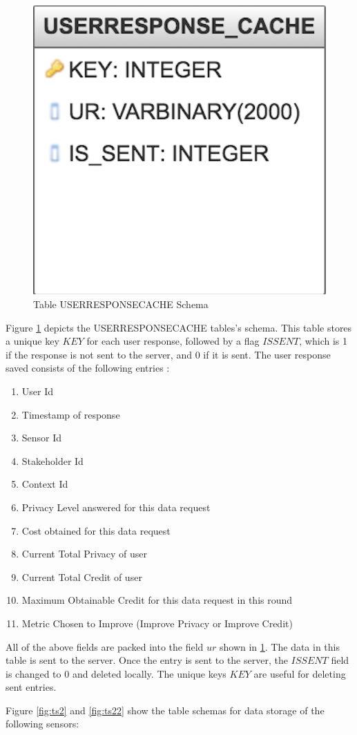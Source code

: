 \begin{figure}[ht!]
\centering
\includegraphics[width=0.4\linewidth]{./images/db_ur}
\caption{Table USERRESPONSECACHE Schema}
\label{fig:db_ur}
\end{figure}

Figure \ref{fig:db_ur} depicts the USERRESPONSECACHE tables's schema. This table stores a unique key $KEY$ for each user response, followed by a flag $ISSENT$, which is 1 if the response is not sent to the server, and 0 if it is sent. The user response saved consists of the following entries :

\begin{enumerate}
	\item User Id
	\item Timestamp of response
    \item Sensor Id
    \item Stakeholder Id
    \item Context Id
    \item Privacy Level answered for this data request
    \item Cost obtained for this data request
    \item Current Total Privacy of user
    \item Current Total Credit of user
    \item Maximum Obtainable Credit for this data request in this round
    \item Metric Chosen to Improve  (Improve Privacy or Improve Credit)
\end{enumerate}

All of the above fields are packed into the field $ur$ shown in \ref{fig:db_ur}. The data in this table is sent to the server. Once the entry is sent to the server, the $ISSENT$ field is changed to 0 and deleted locally. The unique keys $KEY$ are useful for deleting sent entries.

Figure \ref{fig:ts2} and \ref{fig:ts22} show the table schemas for data storage of the following sensors:

